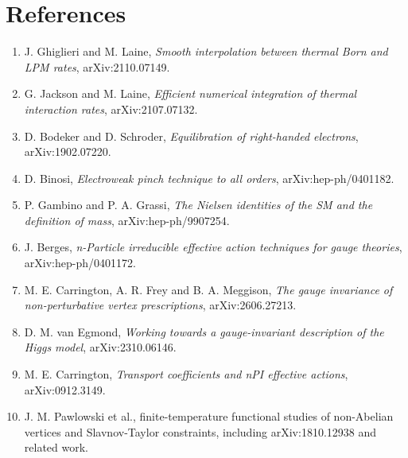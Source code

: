 \documentclass[
  10pt,
]{article}
\providecommand{\tightlist}{%
  \setlength{\itemsep}{0pt}\setlength{\parskip}{0pt}}
\begin{document}
\section{References}\label{references}

\begin{enumerate}
\def\labelenumi{\arabic{enumi}.}
\tightlist
\item
  J. Ghiglieri and M. Laine, \emph{Smooth interpolation between thermal
  Born and LPM rates}, arXiv:2110.07149.
\item
  G. Jackson and M. Laine, \emph{Efficient numerical integration of
  thermal interaction rates}, arXiv:2107.07132.
\item
  D. Bodeker and D. Schroder, \emph{Equilibration of right-handed
  electrons}, arXiv:1902.07220.
\item
  D. Binosi, \emph{Electroweak pinch technique to all orders},
  arXiv:hep-ph/0401182.
\item
  P. Gambino and P. A. Grassi, \emph{The Nielsen identities of the SM
  and the definition of mass}, arXiv:hep-ph/9907254.
\item
  J. Berges, \emph{n-Particle irreducible effective action techniques
  for gauge theories}, arXiv:hep-ph/0401172.
\item
  M. E. Carrington, A. R. Frey and B. A. Meggison, \emph{The gauge
  invariance of non-perturbative vertex prescriptions},
  arXiv:2606.27213.
\item
  D. M. van Egmond, \emph{Working towards a gauge-invariant description
  of the Higgs model}, arXiv:2310.06146.
\item
  M. E. Carrington, \emph{Transport coefficients and nPI effective
  actions}, arXiv:0912.3149.
\item
  J. M. Pawlowski et al., finite-temperature functional studies of
  non-Abelian vertices and Slavnov-Taylor constraints, including
  arXiv:1810.12938 and related work.
\end{enumerate}
\end{document}

